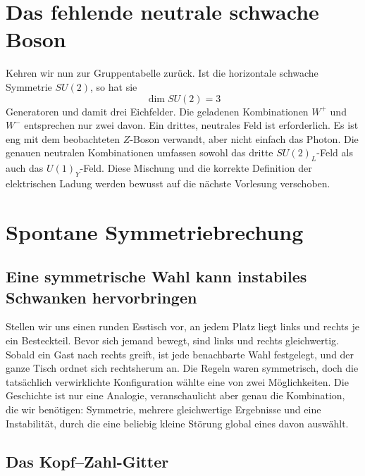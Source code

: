 \section{Das fehlende neutrale schwache Boson}

Kehren wir nun zur Gruppentabelle zurück. Ist die horizontale schwache Symmetrie \(SU(2)\), so hat sie
\begin{equation}
  \dim SU(2)=3
\end{equation}
Generatoren und damit drei Eichfelder. Die geladenen Kombinationen \(W^+\) und \(W^-\) entsprechen nur zwei davon. Ein drittes, neutrales Feld ist erforderlich.
Es ist eng mit dem beobachteten \(Z\)-Boson verwandt, aber nicht einfach das Photon. Die genauen neutralen Kombinationen umfassen sowohl das dritte \(SU(2)_L\)-Feld als auch das \(U(1)_Y\)-Feld. Diese Mischung und die korrekte Definition der elektrischen Ladung werden bewusst auf die nächste Vorlesung verschoben.

\section{Spontane Symmetriebrechung}

\subsection{Eine symmetrische Wahl kann instabiles Schwanken hervorbringen}

Stellen wir uns einen runden Esstisch vor, an jedem Platz liegt links und rechts je ein Besteckteil. Bevor sich jemand bewegt, sind links und rechts gleichwertig. Sobald ein Gast nach rechts greift, ist jede benachbarte Wahl festgelegt, und der ganze Tisch ordnet sich rechtsherum an. Die Regeln waren symmetrisch, doch die tatsächlich verwirklichte Konfiguration wählte eine von zwei Möglichkeiten. Die Geschichte ist nur eine Analogie, veranschaulicht aber genau die Kombination, die wir benötigen: Symmetrie, mehrere gleichwertige Ergebnisse und eine Instabilität, durch die eine beliebig kleine Störung global eines davon auswählt.

\subsection{Das Kopf--Zahl-Gitter}


